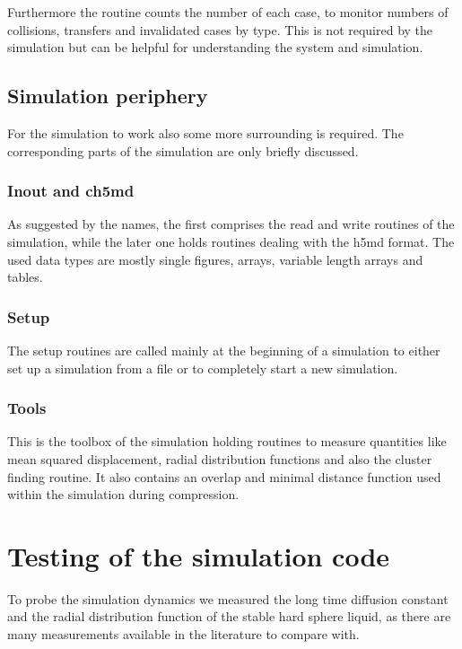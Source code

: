 Furthermore the routine counts the number of each case, to monitor numbers of collisions, transfers and invalidated cases by type. This is not required by the simulation but can be helpful for understanding the system and simulation.\\

\subsection{Simulation periphery}
For the simulation to work also some more surrounding is required. The corresponding parts of the simulation are only briefly discussed.
 
\subsubsection{Inout and ch5md}
As suggested by the names, the first comprises the read and write routines of the simulation, while the later one holds routines dealing with the h5md format. The used data types are mostly single figures, arrays, variable length arrays and tables.

\subsubsection{Setup}
The setup routines are called mainly at the beginning of a simulation to either set up a simulation from a file or to completely start a new simulation.

\subsubsection{Tools}
This is the toolbox of the simulation holding routines to measure quantities like mean squared displacement, radial distribution functions and also the cluster finding routine. It also contains an overlap and minimal distance function used within the simulation during compression.

\section{Testing of the simulation code}
\label{sec:probe}
To probe the simulation dynamics we measured the long time diffusion constant and the radial distribution function of the stable hard sphere liquid, as there are many measurements available in the literature to compare with.

